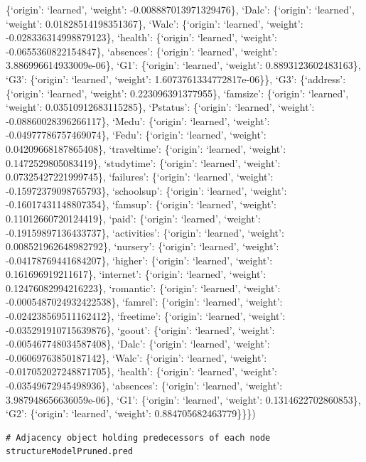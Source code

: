 \documentclass[
]{article}
\begin{document}
\{`origin': `learned', `weight': -0.008887013971329476\}, `Dalc':
\{`origin': `learned', `weight': 0.01828514198351367\}, `Walc':
\{`origin': `learned', `weight': -0.028336314998879123\}, `health':
\{`origin': `learned', `weight': -0.0655360822154847\}, `absences':
\{`origin': `learned', `weight': 3.886996614933009e-06\}, `G1':
\{`origin': `learned', `weight': 0.8893123602483163\}, `G3': \{`origin':
`learned', `weight': 1.6073761334772817e-06\}\}, `G3': \{`address':
\{`origin': `learned', `weight': 0.223096391377955\}, `famsize':
\{`origin': `learned', `weight': 0.03510912683115285\}, `Pstatus':
\{`origin': `learned', `weight': -0.08860028396266117\}, `Medu':
\{`origin': `learned', `weight': -0.04977786757469074\}, `Fedu':
\{`origin': `learned', `weight': 0.04209668187865408\}, `traveltime':
\{`origin': `learned', `weight': 0.1472529805083419\}, `studytime':
\{`origin': `learned', `weight': 0.07325427221999745\}, `failures':
\{`origin': `learned', `weight': -0.15972379098765793\}, `schoolsup':
\{`origin': `learned', `weight': -0.16017431148807354\}, `famsup':
\{`origin': `learned', `weight': 0.11012660720124419\}, `paid':
\{`origin': `learned', `weight': -0.19159897136433737\}, `activities':
\{`origin': `learned', `weight': 0.008521962648982792\}, `nursery':
\{`origin': `learned', `weight': -0.04178769441684207\}, `higher':
\{`origin': `learned', `weight': 0.161696919211617\}, `internet':
\{`origin': `learned', `weight': 0.12476082994216223\}, `romantic':
\{`origin': `learned', `weight': -0.0005487024932422538\}, `famrel':
\{`origin': `learned', `weight': -0.024238569511162412\}, `freetime':
\{`origin': `learned', `weight': -0.035291910715639876\}, `goout':
\{`origin': `learned', `weight': -0.005467748034587408\}, `Dalc':
\{`origin': `learned', `weight': -0.06069763850187142\}, `Walc':
\{`origin': `learned', `weight': -0.017052027248871705\}, `health':
\{`origin': `learned', `weight': -0.03549672945498936\}, `absences':
\{`origin': `learned', `weight': 3.987948656636059e-06\}, `G1':
\{`origin': `learned', `weight': 0.1314622702860853\}, `G2': \{`origin':
`learned', `weight': 0.884705682463779\}\}\})

\begin{verbatim}
# Adjacency object holding predecessors of each node
structureModelPruned.pred
\end{verbatim}
\end{document}
